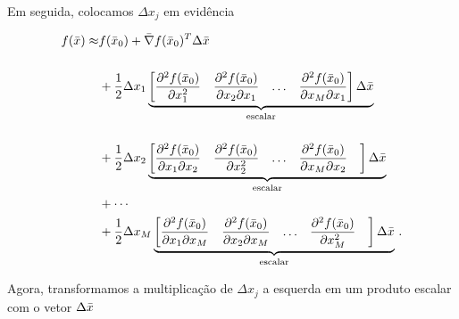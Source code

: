 \noindent Em seguida, colocamos $\Delta x_j$ em evidência

\begin{equation}
\begin{split}
f(\bar{x}) \approx
&f(\bar{x}_0) + \bar{\nabla}f(\bar{x}_0)^T\Delta\bar{x}\
\\[0.5cm]
&+ \dfrac{1}{2}\Delta x_1
\underbrace{
\begin{bmatrix}
\dfrac{\partial^2 f(\bar{x}_0)}{\partial x_1^2} &
\dfrac{\partial^2 f(\bar{x}_0)}{\partial x_2\partial x_1} &
\ldots &
\dfrac{\partial^2 f(\bar{x}_0)}{\partial x_M\partial x_1}
\end{bmatrix}
\Delta\bar{x}}_{\text{escalar}}
\\[0.5cm]
&+ \dfrac{1}{2}\Delta x_2
\underbrace{
\begin{bmatrix}
\dfrac{\partial^2 f(\bar{x}_0)}{\partial x_1\partial x_2} &
\dfrac{\partial^2 f(\bar{x}_0)}{\partial x_2^2} &
\ldots &
\dfrac{\partial^2 f(\bar{x}_0)}{\partial x_M\partial x_2} &
\end{bmatrix}
\Delta\bar{x}}_{\text{escalar}}
\\
&+ \dotsb
\\
&+ \dfrac{1}{2}\Delta x_M
\underbrace{
\begin{bmatrix}
\dfrac{\partial^2 f(\bar{x}_0)}{\partial x_1\partial x_M} &
\dfrac{\partial^2 f(\bar{x}_0)}{\partial x_2\partial x_M} &
\ldots &
\dfrac{\partial^2 f(\bar{x}_0)}{\partial x_M^2} &
\end{bmatrix}
\Delta\bar{x}}_{\text{escalar}}
\thinspace .
\end{split}
\end{equation}

\noindent Agora, transformamos a multiplicação de $\Delta x_j$ a esquerda
em um produto escalar com o vetor $\Delta\bar{x}$

